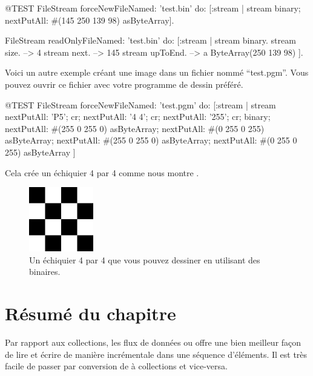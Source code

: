 \documentclass[a4paper,10pt,twoside]{book}
\begin{document}
\begin{code}{@TEST}
FileStream
  forceNewFileNamed: 'test.bin'
  do: [:stream |
          stream
            binary;
            nextPutAll: #(145 250 139 98) asByteArray].

FileStream
  readOnlyFileNamed: 'test.bin'
  do: [:stream |
          stream binary.
          stream size.         --> 4
          stream next.         --> 145
          stream upToEnd. --> a ByteArray(250 139 98)
      ].
\end{code}

Voici un autre exemple cr\'eant une image dans un fichier nomm\'e
``test.pgm''. Vous pouvez ouvrir ce fichier avec votre programme de
dessin pr\'ef\'er\'e.

\begin{code}{@TEST}
FileStream
  forceNewFileNamed: 'test.pgm' 
  do: [:stream |
	stream
		nextPutAll: 'P5'; cr;
		nextPutAll: '4 4'; cr;
		nextPutAll: '255'; cr;
		binary;
		nextPutAll: #(255 0 255 0) asByteArray;
		nextPutAll: #(0 255 0 255) asByteArray;
		nextPutAll: #(255 0 255 0) asByteArray;
		nextPutAll: #(0 255 0 255) asByteArray
	]
\end{code}

Cela cr\'ee un \'echiquier 4 par 4 comme nous montre .

\begin{figure}[!ht]
\centerline{\includegraphics[width=0.25\textwidth]{checkerboard4x4}}
\caption{Un \'echiquier 4 par 4 que vous pouvez dessiner en utilisant des \streams binaires.}
\label{fig:checkerboard4x4}
\vspace{.2in}
\end{figure}

\section{R\'esum\'e du chapitre}

Par rapport aux collections, les flux de donn\'ees ou \streams offre une bien meilleur fa\c{c}on de lire et \'ecrire de mani\`ere incr\'ementale dans une s\'equence d'\'el\'ements.
Il est tr\`es facile de passer par conversion de \streams \`a collections et vice-versa.
\end{document}
